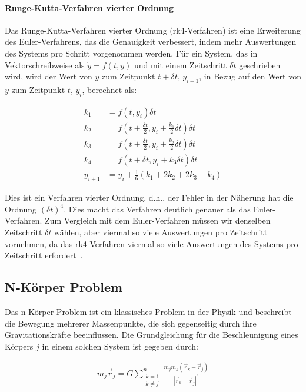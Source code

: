 \documentclass[a4paper,12pt,twoside]{article}
\begin{document}
\paragraph{Runge-Kutta-Verfahren vierter Ordnung}
Das Runge-Kutta-Verfahren vierter Ordnung (rk4-Verfahren) ist eine Erweiterung des Euler-Verfahrens, das die Genauigkeit verbessert, indem mehr Auswertungen des Systems pro Schritt vorgenommen werden. Für ein System, das in Vektorschreibweise als $\dot{y} = f(t, y)$ und mit einem Zeitschritt $\delta t$ geschrieben wird, wird der Wert von $y$ zum Zeitpunkt $t + \delta t$, $y_{i+1}$, in Bezug auf den Wert von $y$ zum Zeitpunkt $t$, $y_i$, berechnet als:

\begin{align*}
    k_1 &= f(t, y_i)\delta t \\
    k_2 &= f\left(t + \frac{\delta t}{2}, y_i + \frac{k_1}{2} \delta t \right) \delta t \\
    k_3 &= f\left(t + \frac{\delta t}{2}, y_i + \frac{k_2}{2} \delta t \right) \delta t \\
    k_4 &= f(t + \delta t, y_i + k_3 \delta t) \delta t \\
    y_{i+1} &= y_i + \frac{1}{6}(k_1 + 2k_2 + 2k_3 + k_4)
\end{align*}

Dies ist ein Verfahren vierter Ordnung, d.h., der Fehler in der Näherung hat die Ordnung $(\delta t)^4$. Dies macht das Verfahren deutlich genauer als das Euler-Verfahren. Zum Vergleich mit dem Euler-Verfahren müssen wir denselben Zeitschritt $\delta t$ wählen, aber viermal so viele Auswertungen pro Zeitschritt vornehmen, da das rk4-Verfahren viermal so viele Auswertungen des Systems pro Zeitschritt erfordert~\cite{Swarthmore2005}.

\subsection{N-Körper Problem}
Das n-Körper-Problem ist ein klassisches Problem in der Physik und beschreibt die Bewegung mehrerer Massenpunkte, die sich gegenseitig durch ihre Gravitationskräfte beeinflussen. Die Grundgleichung für die Beschleunigung eines Körpers \( j \) in einem solchen System ist gegeben durch:

\begin{align*}
	m_j \ddot{\vec{r}}_j = G \sum_{\substack{k=1 \\ k \neq j}}^n \frac{m_j m_k (\vec{r}_k - \vec{r}_j)}{|\vec{r}_k - \vec{r}_j|^3}
\end{align*}
\end{document}
